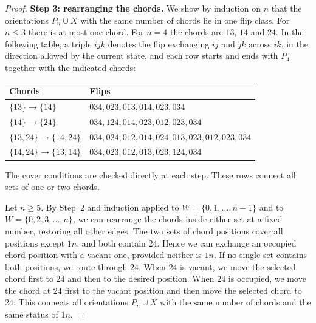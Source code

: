 \begin{proof}
\smallskip\noindent\textbf{Step 3: rearranging the chords.}
We show by induction on $n$ that the orientations $P_n\cup X$ with the same
number of chords lie in one flip class.
For $n\leq3$ there is at most one chord.
For $n=4$ the chords are $13$, $14$ and $24$.
In the following table, a triple $ijk$ denotes the flip exchanging $ij$ and
$jk$ across $ik$, in the direction allowed by the current state, and each row
starts and ends with $P_4$ together with the indicated chords:
\begin{center}
\begin{tabular}{@{}ll@{}}
\toprule
Chords & Flips \\
\midrule
$\{13\}\to\{14\}$ & $034,023,013,014,023,034$ \\
$\{14\}\to\{24\}$ & $034,124,014,023,012,023,034$ \\
$\{13,24\}\to\{14,24\}$ & $034,024,012,014,024,013,023,012,023,034$ \\
$\{14,24\}\to\{13,14\}$ & $034,023,012,013,023,124,034$ \\
\bottomrule
\end{tabular}
\end{center}
The cover conditions are checked directly at each step.
These rows connect all sets of one or two chords.

Let $n\geq5$.
By Step~2 and induction applied to $W=\{0,1,\dotsc,n-1\}$ and to
$W=\{0,2,3,\dotsc,n\}$, we can rearrange the chords inside either set at a fixed
number, restoring all other edges.
The two sets of chord positions cover all positions except $1n$, and both
contain $24$.
Hence we can exchange an occupied chord position with a vacant one, provided
neither is $1n$.
If no single set contains both positions, we route through $24$.
When $24$ is vacant, we move the selected chord first to $24$ and then to the
desired position.
When $24$ is occupied, we move the chord at $24$ first to the vacant position
and then move the selected chord to $24$.
This connects all orientations $P_n\cup X$ with the same number of chords and the same
status of $1n$.


\end{proof}
